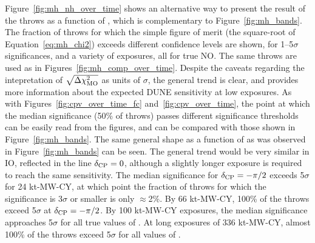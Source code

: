 Figure~\ref{fig:mh_nh_over_time} shows an alternative way to present the result of the throws as a function of \deltacp, which is complementary to Figure~\ref{fig:mh_bands}. The fraction of throws for which the simple figure of merit (the square-root of Equation~\ref{eq:mh_chi2}) exceeds different confidence levels are shown, for 1--5$\sigma$ significances, and a variety of exposures, all for true NO. The same throws are used as in Figures~\ref{fig:mh_comp_over_time}. Despite the caveats regarding the intepretation of $\sqrt{\Delta\chi^{2}_{\mathrm{MO}}}$ as units of $\sigma$, the general trend is clear, and provides more information about the expected DUNE sensitivity at low exposures. As with Figures~\ref{fig:cpv_over_time_fc} and~\ref{fig:cpv_over_time}, the point at which the median significance (50\% of throws) passes different significance thresholds can be easily read from the figures, and can be compared with those shown in Figure~\ref{fig:mh_bands}. The same general shape as a function of \deltacp as was observed in Figure~\ref{fig:mh_bands} can be seen. The general trend would be very similar in IO, reflected in the line $\delta_{\rm CP} = 0$, although a slightly longer exposure is required to reach the same sensitivity. The median significance for $\delta_{\rm CP} = -\pi/2$ exceeds 5$\sigma$ for 24 kt-MW-CY, at which point the fraction of throws for which the significance is 3$\sigma$ or smaller is only $\approx$2\%. By 66 kt-MW-CY, 100\% of the throws exceed 5$\sigma$ at $\delta_{\rm CP} = -\pi/2$. By 100 kt-MW-CY exposures, the median significance approaches 5$\sigma$ for all true values of \deltacp. At long exposures of 336 kt-MW-CY, almost 100\% of the throws exceed 5$\sigma$ for all values of \deltacp.
